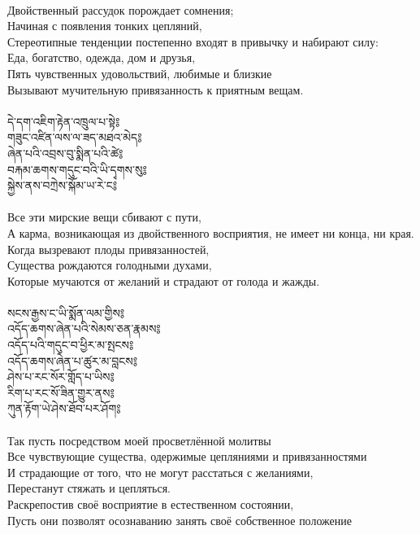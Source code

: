 \\
Двойственный рассудок порождает сомнения; \\
Начиная с появления тонких цепляний, \\
Стереотипные тенденции постепенно входят в привычку и набирают силу: \\
Еда, богатство, одежда, дом и друзья, \\
Пять чувственных удовольствий, любимые и близкие \\
Вызывают мучительную привязанность к приятным вещам.\\
\\
\newpage
{\ti
དེ་དག་འཇིག་རྟེན་འཁྲུལ་པ་སྟེ༔ \\
གཟུང་འཛིན་ལས་ལ་ཟད་མཐའ་མེད༔ \\
ཞེན་པའི་འབྲས་བུ་སྨིན་པའི་ཚེ༔ \\
བརྐམ་ཆགས་གདུང་བའི་ཡི་དྭགས་སུ༔ \\
སྐྱེས་ནས་བཀྲེས་སྐོམ་ཡ་རེ་ང༔}\\
\\
Все эти мирские вещи сбивают с пути, \\
А карма, возникающая из двойственного восприятия, не имеет ни конца, ни края. \\
Когда вызревают плоды привязанностей, \\
Существа рождаются голодными духами, \\
Которые мучаются от желаний и страдают от голода и жажды.\\
\\
{\ti
སངས་རྒྱས་ང་ཡི་སྨོན་ལམ་གྱིས༔ \\
འདོད་ཆགས་ཞེན་པའི་སེམས་ཅན་རྣམས༔ \\
འདོད་པའི་གདུང་བ་ཕྱིར་མ་སྤངས༔ \\
འདོད་ཆགས་ཞེན་པ་ཚུར་མ་བླངས༔ \\
ཤེས་པ་རང་སོར་གློད་པ་ཡིས༔ \\
རིག་པ་རང་སོ་ཟིན་གྱུར་ནས༔ \\
ཀུན་རྟོག་ཡེ་ཤེས་ཐོབ་པར་ཤོག༔}\\
\\
Так пусть посредством моей просветлённой молитвы \\
Все чувствующие существа, одержимые цепляниями и привязанностями \\
И страдающие от того, что не могут расстаться с желаниями, \\
Перестанут стяжать и цепляться. \\
Раскрепостив своё восприятие в естественном состоянии, \\
Пусть они позволят осознаванию занять своё собственное положение \\
